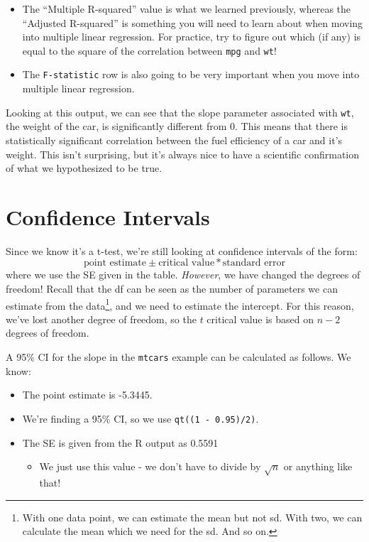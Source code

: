 \documentclass[
  letterpaper,
  DIV=11,
  numbers=noendperiod]{scrreprt}
\providecommand{\tightlist}{%
  \setlength{\itemsep}{0pt}\setlength{\parskip}{0pt}}\usepackage{longtable,booktabs,array}
\begin{document}
\begin{itemize}
  \begin{itemize}
  \tightlist
  \item
    The ``Multiple R-squared'' value is what we learned previously,
    whereas the ``Adjusted R-squared'' is something you will need to
    learn about when moving into multiple linear regression. For
    practice, try to figure out which (if any) is equal to the square of
    the correlation between \texttt{mpg} and \texttt{wt}!
  \item
    The \texttt{F-statistic} row is also going to be very important when
    you move into multiple linear regression.
  \end{itemize}
\end{itemize}

Looking at this output, we can see that the slope parameter associated
with \texttt{wt}, the weight of the car, is significantly different from
0. This means that there is statistically significant correlation
between the fuel efficiency of a car and it's weight. This isn't
surprising, but it's always nice to have a scientific confirmation of
what we hypothesized to be true.

\hypertarget{confidence-intervals-3}{%
\section{Confidence Intervals}\label{confidence-intervals-3}}

Since we know it's a t-test, we're still looking at confidence intervals
of the form: \[
\text{point estimate}\pm\text{critical value}*\text{standard error} 
\] where we use the SE given in the table. \emph{However}, we have
changed the degrees of freedom! Recall that the df can be seen as the
number of parameters we can estimate from the data\footnote{With one
  data point, we can estimate the mean but not sd. With two, we can
  calculate the mean which we need for the sd. And so on.}, and we need
to estimate the intercept. For this reason, we've lost another degree of
freedom, so the \(t\) critical value is based on \(n-2\) degrees of
freedom.

A 95\% CI for the slope in the \texttt{mtcars} example can be calculated
as follows. We know:

\begin{itemize}
\tightlist
\item
  The point estimate is -5.3445.
\item
  We're finding a 95\% CI, so we use \texttt{qt((1\ -\ 0.95)/2)}.
\item
  The SE is given from the R output as 0.5591

  \begin{itemize}
  \tightlist
  \item
    We just use this value - we don't have to divide by \(\sqrt{n}\) or
    anything like that!
  \end{itemize}
\end{itemize}
\end{document}
